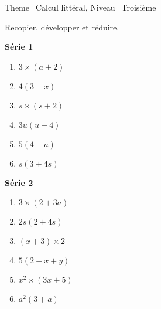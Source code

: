 \documentclass[11pt]{article}
\begin{document}
\begin{multicols}{2}
\begin{Maquette}[Fiche]{Theme=Calcul littéral, Niveau=Troisième}
        \begin{exercice}
            Recopier, développer et réduire.
            \begin{multicols}{2}
                \textbf{Série 1}
                \begin{enumerate}[label=\textbf{\alph*.}]
                    \item $ 3 \times \left( a+2 \right) $
                    \item $ 4 \left( 3+x \right) $
                    \item $ s \times \left( s+2 \right) $
                    \item $ 3u \left( u+4 \right) $
                    \item $ 5 \left( 4+a \right) $
                    \item $ s \left( 3+4s \right) $
                \end{enumerate}
                \textbf{Série 2}
                \begin{enumerate}[label=\textbf{\alph*.}]
                    \item $ 3 \times \left( 2+3a \right) $
                    \item $ 2s \left( 2+4s \right) $
                    \item $ \left( x+3 \right) \times 2 $
                    \item $ 5 \left( 2+x+y \right) $
                    \item $ x^2 \times \left( 3x+5 \right) $
                    \item $ a^2 \left( 3+a \right) $
                \end{enumerate}
            \end{multicols}
        \end{exercice}


\end{Maquette}
\end{multicols}
\end{document}
